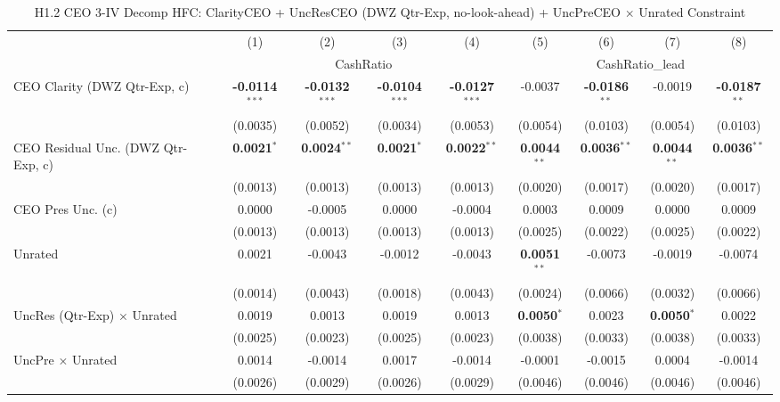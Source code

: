 \begin{landscape}
\begin{table}[H]
\setlength{\tabcolsep}{3pt}
\renewcommand{\arraystretch}{0.85}
\centering
\caption{H1.2 CEO 3-IV Decomp HFC: ClarityCEO + UncResCEO (DWZ Qtr-Exp, no-look-ahead) + UncPreCEO $\times$ Unrated Constraint}
\label{tab:h1_2_ceo2_decomp_qtrexp}
\scriptsize
\begin{tabular}{lcccccccc}
\toprule
 & (1) & (2) & (3) & (4) & (5) & (6) & (7) & (8) \\
 & \multicolumn{4}{c}{CashRatio} & \multicolumn{4}{c}{CashRatio\_lead} \\
\cmidrule(lr){2-5} \cmidrule(lr){6-9}
\midrule
CEO Clarity (DWZ Qtr-Exp, c) & \textbf{-0.0114}$^{***}$ & \textbf{-0.0132}$^{***}$ & \textbf{-0.0104}$^{***}$ & \textbf{-0.0127}$^{***}$ & -0.0037 & \textbf{-0.0186}$^{**}$ & -0.0019 & \textbf{-0.0187}$^{**}$ \\
 & (0.0035) & (0.0052) & (0.0034) & (0.0053) & (0.0054) & (0.0103) & (0.0054) & (0.0103) \\
CEO Residual Unc. (DWZ Qtr-Exp, c) & \textbf{0.0021}$^{*}$ & \textbf{0.0024}$^{**}$ & \textbf{0.0021}$^{*}$ & \textbf{0.0022}$^{**}$ & \textbf{0.0044}$^{**}$ & \textbf{0.0036}$^{**}$ & \textbf{0.0044}$^{**}$ & \textbf{0.0036}$^{**}$ \\
 & (0.0013) & (0.0013) & (0.0013) & (0.0013) & (0.0020) & (0.0017) & (0.0020) & (0.0017) \\
CEO Pres Unc. (c) & 0.0000 & -0.0005 & 0.0000 & -0.0004 & 0.0003 & 0.0009 & 0.0000 & 0.0009 \\
 & (0.0013) & (0.0013) & (0.0013) & (0.0013) & (0.0025) & (0.0022) & (0.0025) & (0.0022) \\
Unrated & 0.0021 & -0.0043 & -0.0012 & -0.0043 & \textbf{0.0051}$^{**}$ & -0.0073 & -0.0019 & -0.0074 \\
 & (0.0014) & (0.0043) & (0.0018) & (0.0043) & (0.0024) & (0.0066) & (0.0032) & (0.0066) \\
UncRes (Qtr-Exp) $\times$ Unrated & 0.0019 & 0.0013 & 0.0019 & 0.0013 & \textbf{0.0050}$^{*}$ & 0.0023 & \textbf{0.0050}$^{*}$ & 0.0022 \\
 & (0.0025) & (0.0023) & (0.0025) & (0.0023) & (0.0038) & (0.0033) & (0.0038) & (0.0033) \\
UncPre $\times$ Unrated & 0.0014 & -0.0014 & 0.0017 & -0.0014 & -0.0001 & -0.0015 & 0.0004 & -0.0014 \\
 & (0.0026) & (0.0029) & (0.0026) & (0.0029) & (0.0046) & (0.0046) & (0.0046) & (0.0046) \\

\end{tabular}
\end{table}
\end{landscape}
